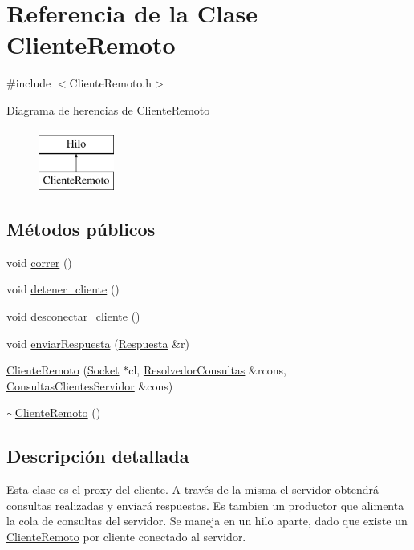 \hypertarget{classClienteRemoto}{\section{\-Referencia de la \-Clase \-Cliente\-Remoto}
\label{classClienteRemoto}
}


{\ttfamily \#include $<$\-Cliente\-Remoto.\-h$>$}

\-Diagrama de herencias de \-Cliente\-Remoto\begin{figure}[H]
\begin{center}
\leavevmode
\includegraphics[height=2.000000cm]{classClienteRemoto}
\end{center}
\end{figure}
\subsection*{\-Métodos públicos}
\begin{DoxyCompactItemize}
\item 
void \hyperlink{classClienteRemoto_a741c9308f0d805e09069c79cfad783f4}{correr} ()
\item 
void \hyperlink{classClienteRemoto_af56e06fb4f6e792d9783619b36678df0}{detener\-\_\-cliente} ()
\item 
void \hyperlink{classClienteRemoto_aa73516bc91c7e0967734b11354018bbf}{desconectar\-\_\-cliente} ()
\item 
void \hyperlink{classClienteRemoto_a3364a54ae8e8076743b0867cd4b9375c}{enviar\-Respuesta} (\hyperlink{classRespuesta}{\-Respuesta} \&r)
\item 
\hyperlink{classClienteRemoto_a77480686aca165ca72a7bb316b9918ac}{\-Cliente\-Remoto} (\hyperlink{classSocket}{\-Socket} $\ast$cl, \hyperlink{classResolvedorConsultas}{\-Resolvedor\-Consultas} \&rcons, \hyperlink{classBLQueue}{\-Consultas\-Clientes\-Servidor} \&cons)
\item 
\hyperlink{classClienteRemoto_a14f0c6930666dbbc3b7d4506696f89ef}{$\sim$\-Cliente\-Remoto} ()
\end{DoxyCompactItemize}


\subsection{\-Descripción detallada}
\-Esta clase es el proxy del cliente. \-A través de la misma el servidor obtendrá consultas realizadas y enviará respuestas. \-Es tambien un productor que alimenta la cola de consultas del servidor. \-Se maneja en un hilo aparte, dado que existe un \hyperlink{classClienteRemoto}{\-Cliente\-Remoto} por cliente conectado al servidor. 

